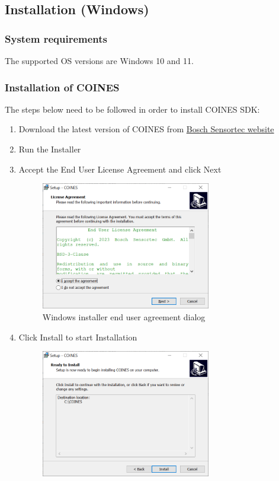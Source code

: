 \documentclass{article}
\begin{document}
\subsection{Installation (Windows)}

\subsubsection{System requirements}
The supported OS versions are Windows 10 and 11.

\subsubsection{Installation of COINES}
The steps below need to be followed in order to install COINES SDK:
\begin{enumerate}
	\item Download the latest version of COINES from \href{https://www.bosch-sensortec.com/software-tools/tools/coines/}{Bosch Sensortec website}
	\item Run the Installer
	\item Accept the End User License Agreement and click Next
	\begin{figure}[H]
		\begin{center}
			\includegraphics[width=0.7\textwidth]{coinesAPI_images/Windows_installation_user_agreement.png}
			\caption{Windows installer end user agreement dialog}
		\end{center}
	\end{figure}
	\item Click Install to start Installation
	\begin{figure}[H]
		\begin{center}
			\includegraphics[width=0.7\textwidth]{coinesAPI_images/Windows_install_dialog.png}

\end{center}
\end{figure}
\end{enumerate}
\end{document}
